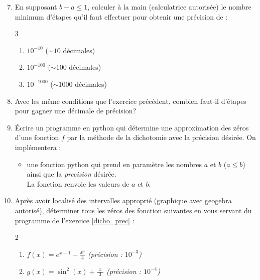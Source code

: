 \documentclass[11pt,a4paper,twoside,greek]{report}
\begin{document}
\bigskip
\begin{boxexstheorieligne}
\begin{enumerate}[label=\textbf{E\thechapter.\arabic*},itemsep=4mm]\setcounter{enumi}{6}
\item En supposant $b-a\leqslant 1$, calculer à la main (calculatrice autorisée) le nombre minimum d'étapes qu'il faut effectuer pour obtenir une précision de :
\begin{multicols}{3}
\begin{enumerate}[label=\roman*)]
\item $10^{-10}$ {\footnotesize($\sim 10$ décimales)}
\item $10^{-100}$ {\footnotesize($\sim 100$ décimales)}
\item $10^{-1000}$ {\footnotesize($\sim 1000$ décimales)}
\end{enumerate}
\end{multicols}
\item Avec les même conditions que l'exercice précédent, combien faut-il d'étapes pour gagner une décimale de précision? 
\item\label{dicho_prec} Écrire un programme en python qui détermine une approximation des zéros d'une fonction $f$ par la méthode de la dichotomie avec la précision désirée. On implémentera :
\vspace{-1mm} 
\begin{itemize}
\item une fonction python  qui prend en paramètre les nombres $a$ et $b$ ($a\leqslant b$) ainsi que la \textit{precision} désirée.\\
La fonction renvoie les valeurs de $a$ et $b$.
\end{itemize}
\item Après avoir localisé des intervalles approprié (graphique avec geogebra autorisé), déterminer tous les zéros des fonction suivantes en vous servant du programme de l'exercice \ref*{dicho_prec} :
\begin{multicols}{2}
\begin{enumerate}[label=\roman*)]
\item $f(x)=e^{x-1}-\frac{x^4}{4}$ \textit{(précision : $10^{-3}$)}
\item $g(x)=\sin^2(x)+\frac{\phantom{^4}x\phantom{^4}}{3}$ \textit{(précision : $10^{-4}$)}
\end{enumerate}
\end{multicols}
%
\end{enumerate}
\end{boxexstheorieligne}
\end{document}
